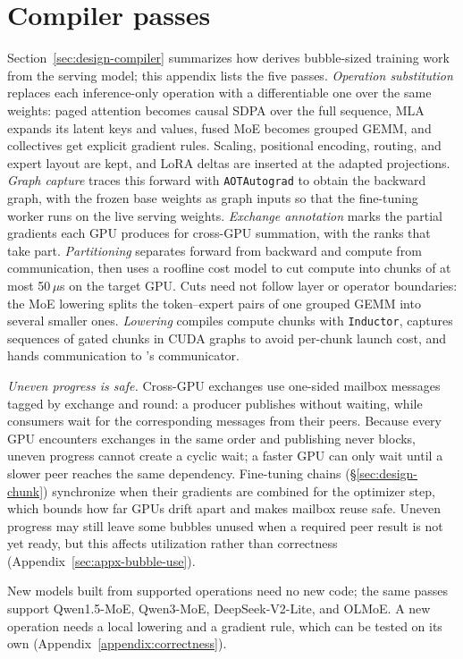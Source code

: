 \section{Compiler passes}
\label{sec:appx-compiler}

Section~\ref{sec:design-compiler} summarizes how \sys{} derives
bubble-sized training work from the serving model; this appendix
lists the five passes.
\emph{Operation substitution} replaces each inference-only operation
with a differentiable one over the same weights: paged attention
becomes causal SDPA over the full sequence, MLA expands its latent keys
and values, fused \ac{MoE} becomes grouped \ac{GEMM}, and collectives
get explicit gradient rules. Scaling, positional encoding, routing, and
expert layout are kept, and LoRA deltas are inserted at the adapted
projections.
\emph{Graph capture} traces this forward with
\texttt{AOTAutograd} to obtain the backward graph, with the frozen base
weights as graph inputs so that the fine-tuning worker runs on the live serving
weights.
\emph{Exchange annotation} marks the partial gradients each GPU
produces for cross-GPU summation, with the ranks that take part.
\emph{Partitioning} separates forward from backward and compute from
communication, then uses a roofline cost model to cut compute into
chunks of at most 50\,$\mu$s on the target GPU. Cuts need not follow
layer or operator boundaries: the \ac{MoE} lowering splits the
token--expert pairs of one grouped \ac{GEMM} into several smaller ones.
\emph{Lowering} compiles compute chunks with \texttt{Inductor}, captures
sequences of gated chunks in CUDA graphs to avoid per-chunk launch
cost, and hands communication to \sys{}'s communicator.

\emph{Uneven progress is safe.}
Cross-GPU exchanges use one-sided mailbox messages tagged by exchange and round: a producer publishes without waiting, while consumers wait for the corresponding messages from their peers.
Because every GPU encounters exchanges in the same order and publishing never blocks, uneven progress cannot create a cyclic wait; a faster GPU can only wait until a slower peer reaches the same dependency.
Fine-tuning chains (\S\ref{sec:design-chunk}) synchronize when their gradients are combined for the optimizer step, which bounds how far GPUs drift apart and makes mailbox reuse safe.
Uneven progress may still leave some bubbles unused when a required peer result is not yet ready, but this affects utilization rather than correctness (Appendix~\ref{sec:appx-bubble-use}).

New models built from supported operations need no new code; the same
passes support Qwen1.5-MoE, Qwen3-MoE, DeepSeek-V2-Lite, and OLMoE.
A new operation needs a local lowering and a gradient rule, which can be
tested on its own (Appendix~\ref{appendix:correctness}).
